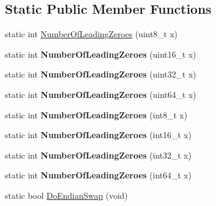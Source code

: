 \subsection*{Static Public Member Functions}
\begin{DoxyCompactItemize}
\item 
static int \hyperlink{class_rak_net_1_1_bit_stream_afc678e70ac2082d65c1b103436ca6b6f}{Number\-Of\-Leading\-Zeroes} (uint8\-\_\-t x)
\item 
\hypertarget{class_rak_net_1_1_bit_stream_a2d4ef910ad4e5b8c0455e51cd8a30363}{static int {\bfseries Number\-Of\-Leading\-Zeroes} (uint16\-\_\-t x)}\label{class_rak_net_1_1_bit_stream_a2d4ef910ad4e5b8c0455e51cd8a30363}

\item 
\hypertarget{class_rak_net_1_1_bit_stream_a2c4acfe66746849ce183d9c2806fdda8}{static int {\bfseries Number\-Of\-Leading\-Zeroes} (uint32\-\_\-t x)}\label{class_rak_net_1_1_bit_stream_a2c4acfe66746849ce183d9c2806fdda8}

\item 
\hypertarget{class_rak_net_1_1_bit_stream_a7b90f93464e37ee3f4c2667214da1742}{static int {\bfseries Number\-Of\-Leading\-Zeroes} (uint64\-\_\-t x)}\label{class_rak_net_1_1_bit_stream_a7b90f93464e37ee3f4c2667214da1742}

\item 
\hypertarget{class_rak_net_1_1_bit_stream_aadcd6c1873b74f52ecc9845839cbdc64}{static int {\bfseries Number\-Of\-Leading\-Zeroes} (int8\-\_\-t x)}\label{class_rak_net_1_1_bit_stream_aadcd6c1873b74f52ecc9845839cbdc64}

\item 
\hypertarget{class_rak_net_1_1_bit_stream_aa0116fab1bb828cd5fdc3c6078dee449}{static int {\bfseries Number\-Of\-Leading\-Zeroes} (int16\-\_\-t x)}\label{class_rak_net_1_1_bit_stream_aa0116fab1bb828cd5fdc3c6078dee449}

\item 
\hypertarget{class_rak_net_1_1_bit_stream_aeaafb080d2d966909389aef965e05b7a}{static int {\bfseries Number\-Of\-Leading\-Zeroes} (int32\-\_\-t x)}\label{class_rak_net_1_1_bit_stream_aeaafb080d2d966909389aef965e05b7a}

\item 
\hypertarget{class_rak_net_1_1_bit_stream_aa39569bd8bc432416f670590fcc6c93f}{static int {\bfseries Number\-Of\-Leading\-Zeroes} (int64\-\_\-t x)}\label{class_rak_net_1_1_bit_stream_aa39569bd8bc432416f670590fcc6c93f}

\item 
\hypertarget{class_rak_net_1_1_bit_stream_a1ce179acbb0ca867dacd482013831a30}{static bool \hyperlink{class_rak_net_1_1_bit_stream_a1ce179acbb0ca867dacd482013831a30}{Do\-Endian\-Swap} (void)}\label{class_rak_net_1_1_bit_stream_a1ce179acbb0ca867dacd482013831a30}


\end{DoxyCompactItemize}
